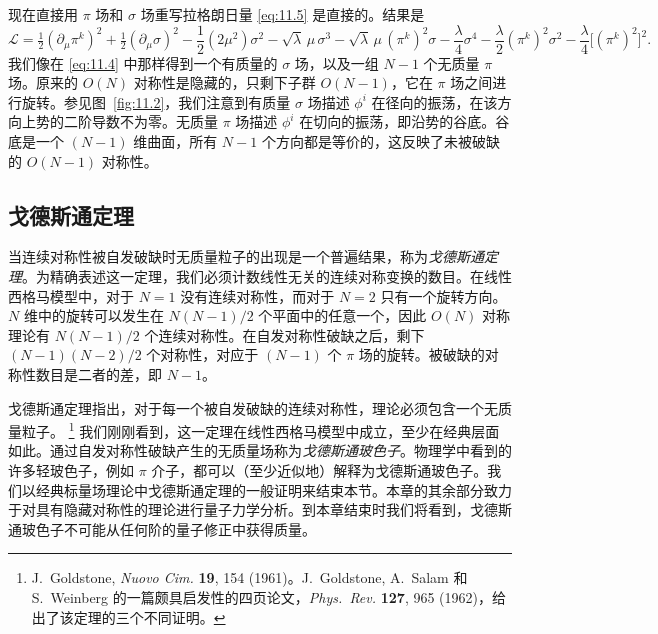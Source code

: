 现在直接用 $\pi$ 场和 $\sigma$ 场重写拉格朗日量 \eqref{eq:11.5} 是直接的。结果是
\begin{equation}
  \mathcal{L} = \tfrac{1}{2}(\partial_\mu\pi^k)^2 + \tfrac{1}{2}
    (\partial_\mu\sigma)^2 - \frac{1}{2}(2\mu^2)\sigma^2
    - \sqrt{\lambda}\,\mu\,\sigma^3 - \sqrt{\lambda}\,\mu\,(\pi^k)^2\sigma
    - \frac{\lambda}{4}\sigma^4 - \frac{\lambda}{2}(\pi^k)^2\sigma^2
    - \frac{\lambda}{4}\bigl[ (\pi^k)^2 \bigr]^2 .
  \label{eq:11.9}
\end{equation}
我们像在 \eqref{eq:11.4} 中那样得到一个有质量的 $\sigma$ 场，以及一组 $N-1$ 个无质量 $\pi$ 场。原来的 $O(N)$ 对称性是隐藏的，只剩下子群 $O(N-1)$，它在 $\pi$ 场之间进行旋转。参见图~\ref{fig:11.2}，我们注意到有质量 $\sigma$ 场描述 $\phi^i$ 在径向的振荡，在该方向上势的二阶导数不为零。无质量 $\pi$ 场描述 $\phi^i$ 在切向的振荡，即沿势的谷底。谷底是一个 $(N-1)$ 维曲面，所有 $N-1$ 个方向都是等价的，这反映了未被破缺的 $O(N-1)$ 对称性。

\subsection{戈德斯通定理}

当连续对称性被自发破缺时无质量粒子的出现是一个普遍结果，称为\emph{戈德斯通定理}。为精确表述这一定理，我们必须计数线性无关的连续对称变换的数目。在线性西格马模型中，对于 $N = 1$ 没有连续对称性，而对于 $N = 2$ 只有一个旋转方向。$N$ 维中的旋转可以发生在 $N(N-1)/2$ 个平面中的任意一个，因此 $O(N)$ 对称理论有 $N(N-1)/2$ 个连续对称性。在自发对称性破缺之后，剩下 $(N-1)(N-2)/2$ 个对称性，对应于 $(N-1)$ 个 $\pi$ 场的旋转。被破缺的对称性数目是二者的差，即 $N-1$。

戈德斯通定理指出，对于每一个被自发破缺的连续对称性，理论必须包含一个无质量粒子。%
\footnote{J.~Goldstone, \emph{Nuovo Cim.} \textbf{19}, 154 (1961)。J.~Goldstone, A.~Salam 和 S.~Weinberg 的一篇颇具启发性的四页论文，\emph{Phys.\ Rev.} \textbf{127}, 965 (1962)，给出了该定理的三个不同证明。}
我们刚刚看到，这一定理在线性西格马模型中成立，至少在经典层面如此。通过自发对称性破缺产生的无质量场称为\emph{戈德斯通玻色子}。物理学中看到的许多轻玻色子，例如 $\pi$ 介子，都可以（至少近似地）解释为戈德斯通玻色子。我们以经典标量场理论中戈德斯通定理的一般证明来结束本节。本章的其余部分致力于对具有隐藏对称性的理论进行量子力学分析。到本章结束时我们将看到，戈德斯通玻色子不可能从任何阶的量子修正中获得质量。

